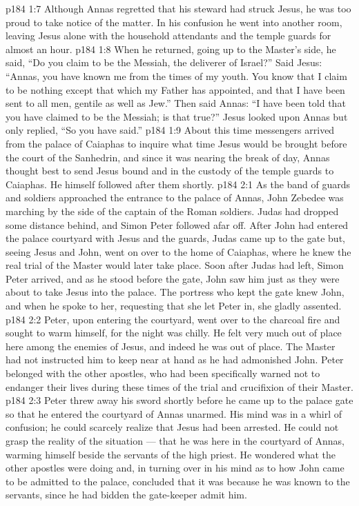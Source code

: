 \vs p184 1:7 Although Annas regretted that his steward had struck Jesus, he was too proud to take notice of the matter. In his confusion he went into another room, leaving Jesus alone with the household attendants and the temple guards for almost an hour.
\vs p184 1:8 When he returned, going up to the Master’s side, he said, “Do you claim to be the Messiah, the deliverer of Israel?” Said Jesus: \textcolor{ubdarkred}{“Annas, you have known me from the times of my youth. You know that I claim to be nothing except that which my Father has appointed, and that I have been sent to all men, gentile as well as Jew.”} Then said Annas: “I have been told that you have claimed to be the Messiah; is that true?” Jesus looked upon Annas but only replied, \textcolor{ubdarkred}{“So you have said.”}
\vs p184 1:9 About this time messengers arrived from the palace of Caiaphas to inquire what time Jesus would be brought before the court of the Sanhedrin, and since it was nearing the break of day, Annas thought best to send Jesus bound and in the custody of the temple guards to Caiaphas. He himself followed after them shortly.
\vs p184 2:1 As the band of guards and soldiers approached the entrance to the palace of Annas, John Zebedee was marching by the side of the captain of the Roman soldiers. Judas had dropped some distance behind, and Simon Peter followed afar off. After John had entered the palace courtyard with Jesus and the guards, Judas came up to the gate but, seeing Jesus and John, went on over to the home of Caiaphas, where he knew the real trial of the Master would later take place. Soon after Judas had left, Simon Peter arrived, and as he stood before the gate, John saw him just as they were about to take Jesus into the palace. The portress who kept the gate knew John, and when he spoke to her, requesting that she let Peter in, she gladly assented.
\vs p184 2:2 Peter, upon entering the courtyard, went over to the charcoal fire and sought to warm himself, for the night was chilly. He felt very much out of place here among the enemies of Jesus, and indeed he was out of place. The Master had not instructed him to keep near at hand as he had admonished John. Peter belonged with the other apostles, who had been specifically warned not to endanger their lives during these times of the trial and crucifixion of their Master.
\vs p184 2:3 Peter threw away his sword shortly before he came up to the palace gate so that he entered the courtyard of Annas unarmed. His mind was in a whirl of confusion; he could scarcely realize that Jesus had been arrested. He could not grasp the reality of the situation --- that he was here in the courtyard of Annas, warming himself beside the servants of the high priest. He wondered what the other apostles were doing and, in turning over in his mind as to how John came to be admitted to the palace, concluded that it was because he was known to the servants, since he had bidden the gate\hyp{}keeper admit him.
